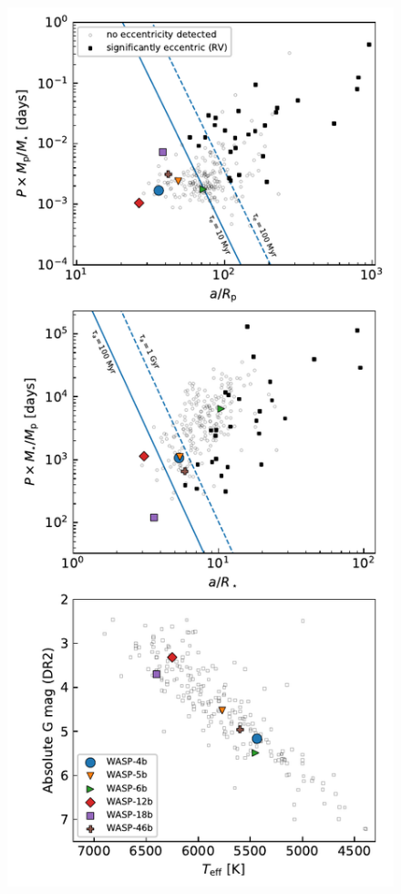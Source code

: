 \documentclass[12pt,twocolumn,tighten]{aastex62}
\begin{document}
\begin{figure}[t]
  \begin{center}
    \includegraphics[height=0.88\textheight]{f5.pdf}
  \end{center}

\end{figure}
\end{document}
